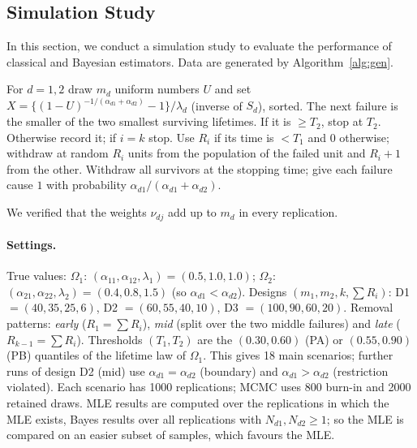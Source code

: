 \documentclass[a4paper,11pt]{article}
\begin{document}
\subsection{Simulation Study}
In this section, we conduct a simulation study to evaluate the performance of classical and Bayesian estimators. Data are generated by Algorithm~\ref{alg:gen}.
\begin{algorithm}[htbp]
\caption{Generation of JIAPCS competing risks data}\label{alg:gen}
\begin{algorithmic}[1]
\STATE For $d=1,2$ draw $m_d$ uniform numbers $U$ and set $X=\{(1-U)^{-1/(\alpha_{d1}+\alpha_{d2})}-1\}/\lambda_d$ (inverse of $S_d$), sorted.
\STATE The next failure is the smaller of the two smallest surviving lifetimes. If it is $\ge T_2$, stop at $T_2$. Otherwise record it; if $i=k$ stop.
\STATE Use $R_i$ if its time is $<T_1$ and $0$ otherwise; withdraw at random $R_i$ units from the population of the failed unit and $R_i+1$ from the other.
\ENDFOR
\STATE Withdraw all survivors at the stopping time; give each failure cause $1$ with probability $\alpha_{d1}/(\alpha_{d1}+\alpha_{d2})$.
\end{algorithmic}
\end{algorithm}
We verified that the weights $\nu_{dj}$ add up to $m_d$ in every replication.

\paragraph{Settings.} True values: $\Omega_1$: $(\alpha_{11},\alpha_{12},\lambda_1)=(0.5,1.0,1.0)$; $\Omega_2$: $(\alpha_{21},\alpha_{22},\lambda_2)=(0.4,0.8,1.5)$ (so $\alpha_{d1}<\alpha_{d2}$). Designs $(m_1,m_2,k,\sum R_i)$: D1 $=(40,35,25,6)$, D2 $=(60,55,40,10)$, D3 $=(100,90,60,20)$. Removal patterns: \emph{early} ($R_1=\sum R_i$), \emph{mid} (split over the two middle failures) and \emph{late} ($R_{k-1}=\sum R_i$). Thresholds $(T_1,T_2)$ are the $(0.30,0.60)$ (PA) or $(0.55,0.90)$ (PB) quantiles of the lifetime law of $\Omega_1$. This gives 18 main scenarios; further runs of design D2 (mid) use $\alpha_{d1}=\alpha_{d2}$ (boundary) and $\alpha_{d1}>\alpha_{d2}$ (restriction violated). Each scenario has 1000 replications; MCMC uses 800 burn-in and 2000 retained draws. MLE results are computed over the replications in which the MLE exists, Bayes results over all replications with $N_{d1},N_{d2}\ge1$; so the MLE is compared on an easier subset of samples, which favours the MLE.
\end{document}
